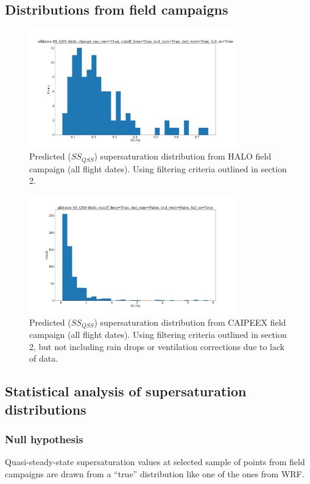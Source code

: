 \documentclass{article}
\begin{document}
\subsection{Distributions from field campaigns}
\begin{figure}[ht]
    \centering
    \includegraphics[width=9cm]{revhalo/v24_ss_qss_hist_cas_alldates_figure.png}
    \caption{Predicted ($SS_{QSS}$) supersaturation distribution from HALO field campaign (all flight dates). Using filtering criteria outlined in section 2.}
    \label{haloqsshist}
\end{figure}
\begin{figure}[ht]
    \centering
    \includegraphics[width=9cm]{revcaipeex/v10_ss_qss_hist_alldates_figure.png}
    \caption{Predicted ($SS_{QSS}$) supersaturation distribution from CAIPEEX field campaign (all flight dates). Using filtering criteria outlined in section 2, but not including rain drops or ventilation corrections due to lack of data.}
    \label{caipeexqsshist}
\end{figure}

\subsection{Statistical analysis of supersaturation distributions}
\subsubsection{Null hypothesis}
Quasi-steady-state supersaturation values at selected sample of points from field campaigns are drawn from a ``true'' distribution like one of the ones from WRF. 
\end{document}
